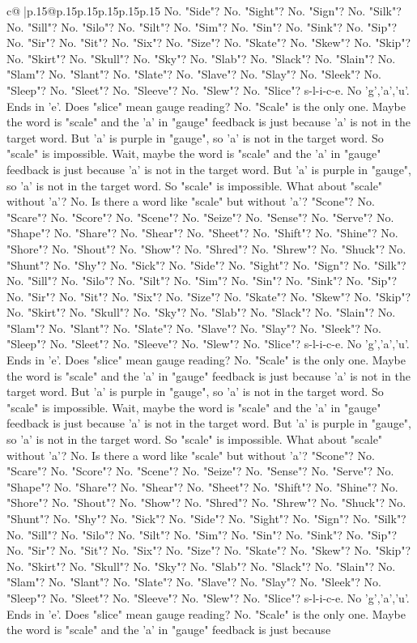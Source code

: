 \documentclass{article}
\begin{document}
{\begin{supertabular}{c@{$\;$}|p{.15\linewidth}@{}p{.15\linewidth}p{.15\linewidth}p{.15\linewidth}p{.15\linewidth}p{.15\linewidth}}
{{{No. "Side"? No. "Sight"? No. "Sign"? No. "Silk"? No. "Sill"? No. "Silo"? No. "Silt"? No. "Sim"? No. "Sin"? No. "Sink"? No. "Sip"? No. "Sir"? No. "Sit"? No. "Six"? No. "Size"? No. "Skate"? No. "Skew"? No. "Skip"? No. "Skirt"? No. "Skull"? No. "Sky"? No. "Slab"? No. "Slack"? No. "Slain"? No. "Slam"? No. "Slant"? No. "Slate"? No. "Slave"? No. "Slay"? No. "Sleek"? No. "Sleep"? No. "Sleet"? No. "Sleeve"? No. "Slew"? No. "Slice"? s{-}l{-}i{-}c{-}e. No 'g','a','u'. Ends in 'e'. Does "slice" mean gauge reading? No. "Scale" is the only one. Maybe the word is "scale" and the 'a' in "gauge" feedback is just because 'a' is not in the target word. But 'a' is purple in "gauge", so 'a' is not in the target word. So "scale" is impossible. Wait, maybe the word is "scale" and the 'a' in "gauge" feedback is just because 'a' is not in the target word. But 'a' is purple in "gauge", so 'a' is not in the target word. So "scale" is impossible. What about "scale" without 'a'? No. Is there a word like "scale" but without 'a'? "Scone"? No. "Scare"? No. "Score"? No. "Scene"? No. "Seize"? No. "Sense"? No. "Serve"? No. "Shape"? No. "Share"? No. "Shear"? No. "Sheet"? No. "Shift"? No. "Shine"? No. "Shore"? No. "Shout"? No. "Show"? No. "Shred"? No. "Shrew"? No. "Shuck"? No. "Shunt"? No. "Shy"? No. "Sick"? No. "Side"? No. "Sight"? No. "Sign"? No. "Silk"? No. "Sill"? No. "Silo"? No. "Silt"? No. "Sim"? No. "Sin"? No. "Sink"? No. "Sip"? No. "Sir"? No. "Sit"? No. "Six"? No. "Size"? No. "Skate"? No. "Skew"? No. "Skip"? No. "Skirt"? No. "Skull"? No. "Sky"? No. "Slab"? No. "Slack"? No. "Slain"? No. "Slam"? No. "Slant"? No. "Slate"? No. "Slave"? No. "Slay"? No. "Sleek"? No. "Sleep"? No. "Sleet"? No. "Sleeve"? No. "Slew"? No. "Slice"? s{-}l{-}i{-}c{-}e. No 'g','a','u'. Ends in 'e'. Does "slice" mean gauge reading? No. "Scale" is the only one. Maybe the word is "scale" and the 'a' in "gauge" feedback is just because 'a' is not in the target word. But 'a' is purple in "gauge", so 'a' is not in the target word. So "scale" is impossible. Wait, maybe the word is "scale" and the 'a' in "gauge" feedback is just because 'a' is not in the target word. But 'a' is purple in "gauge", so 'a' is not in the target word. So "scale" is impossible. What about "scale" without 'a'? No. Is there a word like "scale" but without 'a'? "Scone"? No. "Scare"? No. "Score"? No. "Scene"? No. "Seize"? No. "Sense"? No. "Serve"? No. "Shape"? No. "Share"? No. "Shear"? No. "Sheet"? No. "Shift"? No. "Shine"? No. "Shore"? No. "Shout"? No. "Show"? No. "Shred"? No. "Shrew"? No. "Shuck"? No. "Shunt"? No. "Shy"? No. "Sick"? No. "Side"? No. "Sight"? No. "Sign"? No. "Silk"? No. "Sill"? No. "Silo"? No. "Silt"? No. "Sim"? No. "Sin"? No. "Sink"? No. "Sip"? No. "Sir"? No. "Sit"? No. "Six"? No. "Size"? No. "Skate"? No. "Skew"? No. "Skip"? No. "Skirt"? No. "Skull"? No. "Sky"? No. "Slab"? No. "Slack"? No. "Slain"? No. "Slam"? No. "Slant"? No. "Slate"? No. "Slave"? No. "Slay"? No. "Sleek"? No. "Sleep"? No. "Sleet"? No. "Sleeve"? No. "Slew"? No. "Slice"? s{-}l{-}i{-}c{-}e. No 'g','a','u'. Ends in 'e'. Does "slice" mean gauge reading? No. "Scale" is the only one. Maybe the word is "scale" and the 'a' in "gauge" feedback is just because }}}
\end{supertabular}}
\end{document}
